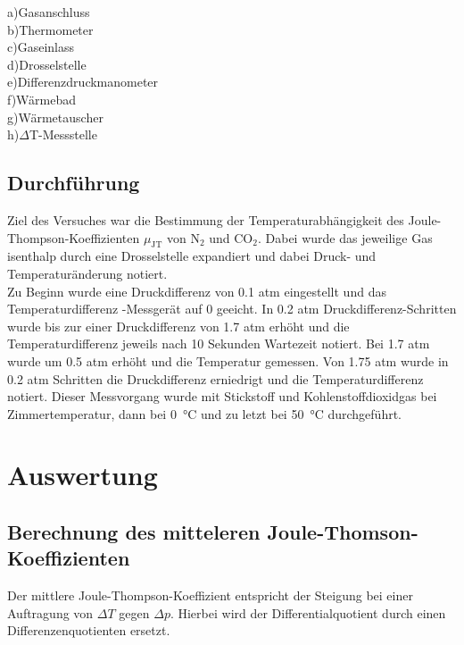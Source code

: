 \documentclass[a4paper,12pt,oneside,onecolum,final,openany]{report}
\begin{document}
\newpage
a)Gasanschluss\\
b)Thermometer\\
c)Gaseinlass\\
d)Drosselstelle\\
e)Differenzdruckmanometer\\
f)Wärmebad\\
g)Wärmetauscher\\
h)$\Delta$T-Messstelle\\

\section{Durchführung}
Ziel des Versuches war die Bestimmung der Temperaturabhängigkeit des Joule-Thompson-Koeffizienten $\mu_\mathrm{JT}$ von $\mathrm{N}_2$ und $\mathrm{CO}_2$. Dabei wurde das jeweilige Gas isenthalp durch eine Drosselstelle expandiert und dabei Druck- und Temperaturänderung notiert.\\

Zu Beginn wurde eine Druckdifferenz von 0.1 atm eingestellt und das Temperaturdifferenz -Messgerät auf 0 geeicht. 
In 0.2 atm Druckdifferenz-Schritten wurde bis zur einer Druckdifferenz von 1.7 atm erhöht und die Temperaturdifferenz jeweils nach 10 Sekunden Wartezeit notiert. Bei 1.7 atm wurde um 0.5 atm erhöht und die Temperatur gemessen. Von 1.75 atm wurde in 0.2 atm Schritten die Druckdifferenz erniedrigt und die Temperaturdifferenz notiert. Dieser Messvorgang wurde mit Stickstoff und Kohlenstoffdioxidgas bei Zimmertemperatur, dann bei 0~°C und zu letzt bei 50~°C durchgeführt.
\chapter{Auswertung}



\section{Berechnung des mitteleren Joule-Thomson-Koeffizienten}
Der mittlere Joule-Thompson-Koeffizient entspricht der Steigung bei einer Auftragung von $\Delta T$ gegen $\Delta p$. Hierbei wird der Differentialquotient durch einen Differenzenquotienten ersetzt.\\
\end{document}
